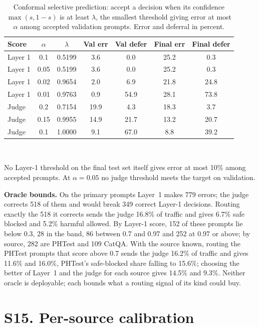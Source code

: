 \begin{table}[!htbp]
\caption{Conformal selective prediction: accept a decision when its confidence $\max(s,1-s)$ is at least $\lambda$, the smallest threshold giving error at most $\alpha$ among accepted validation prompts. Error and deferral in percent.}
\label{tab:conformal}
\centering
\scriptsize
\setlength{\tabcolsep}{3pt}
\begin{tabular}{@{}lcccccc@{}}
\toprule
Score & $\alpha$ & $\lambda$ & Val err & Val defer & Final err & Final defer \\
\midrule
Layer 1 & 0.1 & 0.5199 & 3.6 & 0.0 & 25.2 & 0.3 \\
Layer 1 & 0.05 & 0.5199 & 3.6 & 0.0 & 25.2 & 0.3 \\
Layer 1 & 0.02 & 0.9654 & 2.0 & 6.9 & 21.8 & 24.8 \\
Layer 1 & 0.01 & 0.9763 & 0.9 & 54.9 & 28.1 & 73.8 \\
\midrule
Judge & 0.2 & 0.7154 & 19.9 & 4.3 & 18.3 & 3.7 \\
Judge & 0.15 & 0.9955 & 14.9 & 21.7 & 13.2 & 20.7 \\
Judge & 0.1 & 1.0000 & 9.1 & 67.0 & 8.8 & 39.2 \\
\bottomrule
\end{tabular}
\\[2pt]
\parbox{\linewidth}{\scriptsize No Layer-1 threshold on the final test set itself gives error at most 10\% among accepted prompts. At $\alpha=0.05$ no judge threshold meets the target on validation.}
\end{table}

\textbf{Oracle bounds.} On the primary prompts Layer~1 makes 779 errors; the judge corrects 518 of them and would break 349 correct Layer-1 decisions. Routing exactly the 518 it corrects sends the judge 16.8\% of traffic and gives 6.7\% safe blocked and 5.2\% harmful allowed. By Layer-1 score, 152 of these prompts lie below 0.3, 28 in the band, 86 between 0.7 and 0.97 and 252 at 0.97 or above; by source, 282 are PHTest and 109 CatQA. With the source known, routing the PHTest prompts that score above 0.7 sends the judge 16.2\% of traffic and gives 11.6\% and 16.0\%, PHTest's safe-blocked share falling to 15.6\%; choosing the better of Layer~1 and the judge for each source gives 14.5\% and 9.3\%. Neither oracle is deployable; each bounds what a routing signal of its kind could buy.

\section*{S15. Per-source calibration}

